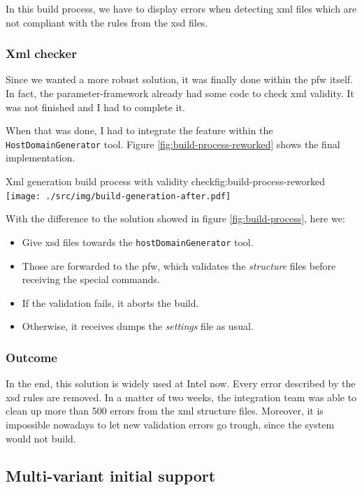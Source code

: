 In this build process, we have to display errors when detecting \gls{xml} files which are not compliant with the rules from the
\gls{xsd} files.

\subsubsection{Xml checker}

Since we wanted a more robust solution, it was finally done within the \gls{pfw} itself.
In fact, the parameter-framework already had some code to check \gls{xml} validity. It was not
finished and I had to complete it.

When that was done, I had to integrate the feature within the \lstinline{HostDomainGenerator} tool.
Figure \ref{fig:build-process-reworked} shows the final implementation.

\begin{figureGraphics}{Xml generation build process with validity check}{fig:build-process-reworked}
    \texttt{[image: ./src/img/build-generation-after.pdf]}
\end{figureGraphics}

With the difference to the solution showed in figure \ref{fig:build-process}, here we:
\begin{itemize}
    \item Give \gls{xsd} files towards the \lstinline{hostDomainGenerator} tool.
    \item Those are forwarded to the \gls{pfw}, which validates the \emph{structure} files before receiving the special commands.
    \item If the validation fails, it aborts the build.
    \item Otherwise, it receives dumps the \emph{settings} file as usual.
\end{itemize}

\subsubsection{Outcome}
In the end, this solution is widely used at Intel now. Every error described by the \gls{xsd} rules are removed.
In a matter of two weeks, the integration team was able to clean up more than 500 errors from the \gls{xml} structure files.
Moreover, it is impossible nowadays to let new validation errors go trough, since the system would not build.


\subsection{Multi-variant initial support}
